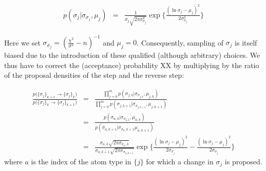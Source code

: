 \begin{eqnarray}
p(\sigma_j | \sigma_{\sigma_j}, \mu_j) &=& \frac{1}{\sigma_j\sqrt{2\pi \sigma_{\sigma_j}^2}} \exp{} \Biggl\{ \frac{(\ln{\sigma_j-\mu_j})^2}{2\sigma_{\sigma_j}^2} \Biggr\}
\end{eqnarray}

Here we set $\sigma_{\sigma_j} = \left( \frac{\chi^2}{\sigma^2}-n\right)^{-1}$ and $\mu_j = 0$. Consequently, sampling of $\sigma_j$ is itself biased due to the introduction of these qualified (although arbitrary) choices. We thus have to correct the (acceptance) probability XX by multiplying by the ratio of the proposal densities of the step and the reverse step:

\begin{eqnarray}
\frac{p\Big( \{\sigma_j\}_{k+1} \rightarrow \{\sigma_j\}_k\Big)}{p\Big( \{\sigma_j\}_k \rightarrow \{\sigma_j\}_{k+1} \Big)} & = & \frac{\prod_{j=0}^{m}p(\sigma_{j,k} | \sigma_{\sigma_{j,k}}, \mu_{j,k}) }{\prod_{j=0}^{m}p(\sigma_{j,k+1} | \sigma_{\sigma_{j,k+1}}, \mu_{j,k+1})}\\
& = & \frac{p(\sigma_{a,k} | \sigma_{\sigma_{a,k}}, \mu_{a,k}) }{p(\sigma_{a,k+1} | \sigma_{\sigma_{a},k+1} \mu_{a,k+1})}\\
&=& \frac{\sigma_{a,k}\sqrt{2\pi \sigma_{\sigma_{a},k}}}{\sigma_{a,k+1}\sqrt{2\pi \sigma_{\sigma_{a,k+1}}}} \exp{} \Biggl\{ \frac{(\ln{\sigma_j-\mu_j})^2}{2\sigma_{\sigma_j}} - \frac{(\ln{\sigma_j-\mu_j})^2}{2\sigma_{\sigma_j}} \Biggr\}
\end{eqnarray}
where $a$ is the index of the atom type in $\{j\}$ for which a change in $\sigma_j$ is proposed.





